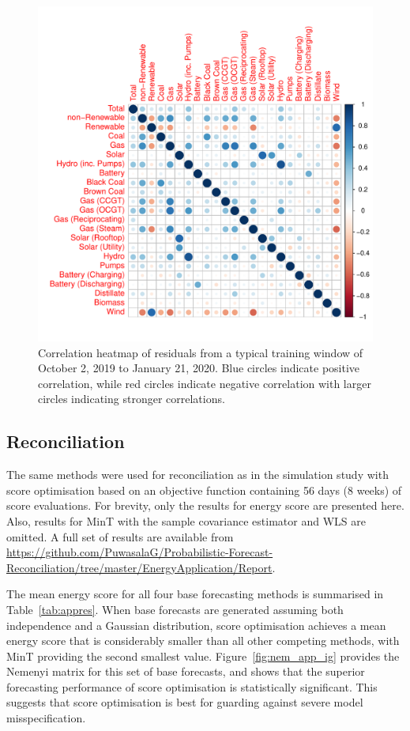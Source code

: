 \documentclass[12pt]{article}
\theoremstyle{definition}
\begin{document}
\begin{figure}
\includegraphics[width=.95\textwidth]{Figs/corr.pdf}
\caption{Correlation heatmap of residuals from a typical training window of October 2, 2019 to January 21, 2020. Blue circles indicate positive correlation, while red circles indicate negative correlation with larger circles indicating stronger correlations.}
\label{fig:emp_corr}
\end{figure}	

\subsection{Reconciliation}\label{sec:applreco}

The same methods were used for reconciliation as in the simulation study with score optimisation based on an objective function containing 56 days (8 weeks) of score evaluations.  For brevity, only the results for energy score are presented here.  Also, results for MinT with the sample covariance estimator and WLS are omitted.  A full set of results are available from \url{https://github.com/PuwasalaG/Probabilistic-Forecast-Reconciliation/tree/master/EnergyApplication/Report}.

The mean energy score for all four base forecasting methods is summarised in Table~\ref{tab:appres}.  When base forecasts are generated assuming both independence and a Gaussian distribution, score optimisation achieves a mean energy score that is considerably smaller than all other competing methods, with MinT providing the second smallest value.  Figure~\ref{fig:nem_app_ig} provides the Nemenyi matrix for this set of base forecasts, and shows that the superior forecasting performance of score optimisation is statistically significant.  This suggests that score optimisation is best for guarding against severe model misspecification.   
\end{document}
